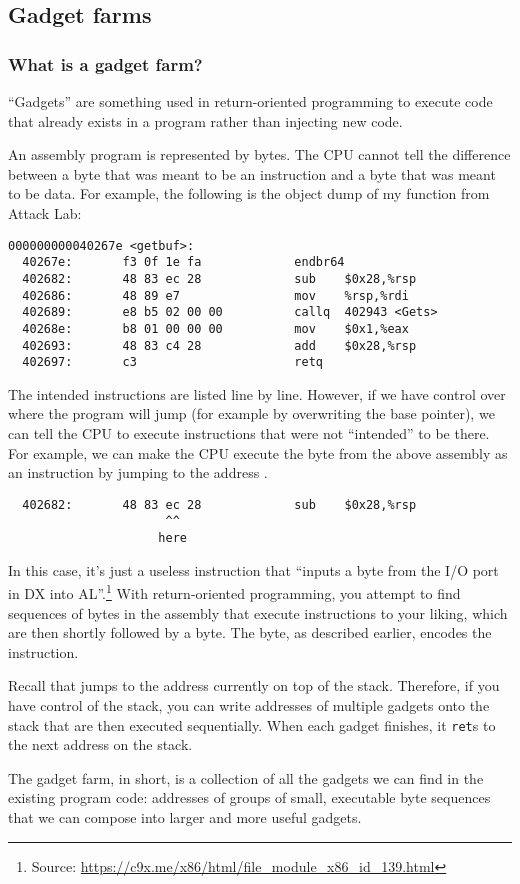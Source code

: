\subsection{Gadget farms}

\subsubsection{What is a gadget farm?}

``Gadgets'' are something used in return-oriented programming to execute code that already exists in a program rather than injecting new code.

An assembly program is represented by bytes. The CPU cannot tell the difference between a byte that was meant to be an instruction and a byte that was meant to be data. For example, the following is the object dump of my  function from Attack Lab:

\begin{verbatim}
000000000040267e <getbuf>:
  40267e:       f3 0f 1e fa             endbr64
  402682:       48 83 ec 28             sub    $0x28,%rsp
  402686:       48 89 e7                mov    %rsp,%rdi
  402689:       e8 b5 02 00 00          callq  402943 <Gets>
  40268e:       b8 01 00 00 00          mov    $0x1,%eax
  402693:       48 83 c4 28             add    $0x28,%rsp
  402697:       c3                      retq
\end{verbatim}

The intended instructions are listed line by line. However, if we have control over where the program will jump (for example by overwriting the base pointer), we can tell the CPU to execute instructions that were not ``intended'' to be there. For example, we can make the CPU execute the  byte from the above assembly as an instruction by jumping to the address .

\begin{verbatim}
  402682:       48 83 ec 28             sub    $0x28,%rsp
                      ^^
                     here
\end{verbatim}

In this case, it's just a useless instruction that ``inputs a byte from the I/O port in DX into AL''.\footnote{Source: \url{https://c9x.me/x86/html/file_module_x86_id_139.html}} With return-oriented programming, you attempt to find sequences of bytes in the assembly that execute instructions to your liking, which are then shortly followed by a  byte. The  byte, as described earlier, encodes the  instruction. 

Recall that  jumps to the address currently on top of the stack.
Therefore, if you have control of the stack, you can write addresses of multiple gadgets onto the stack that are then executed sequentially. When each gadget finishes, it \texttt{ret}s to the next address on the stack.

The gadget farm, in short, is a collection of all the gadgets we can find in the existing program code: addresses of groups of small, executable byte sequences that we can compose into larger and more useful gadgets.

